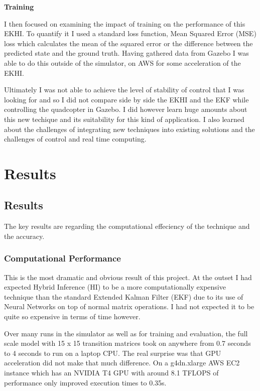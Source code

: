 \documentclass[]{../resources/final_report}
\begin{document}
\textbf{Training}

I then focused on examining the impact of training on the performance of this EKHI. To quantify it I used a standard loss function, Mean Squared Error (MSE) loss which calculates the mean of the squared error or the difference between the predicted state and the ground truth. Having gathered data from Gazebo I was able to do this outside of the simulator, on AWS for some acceleration of the EKHI.

Ultimately I was not able to achieve the level of stability of control that I was looking for and so I did not compare side by side the EKHI and the EKF while controlling the quadcopter in Gazebo. I did however learn huge amounts about this new techique and its suitability for this kind of application. I also learned about the challenges of integrating new techniques into existing solutions and the challenges of control and real time computing.

\chapter{Results}

\section{Results}

The key results are regarding the computational effeciency of the technique and the accuracy.

\subsection{Computational Performance}

This is the most dramatic and obvious result of this project. At the outset I had expected Hybrid Inference (HI) to be a more computationally expensive technique than the standard Extended Kalman Filter (EKF) due to its use of Neural Networks on top of normal matrix operations. I had not expected it to be quite so expensive in terms of time however.

Over many runs in the simulator as well as for training and evaluation, the full scale model with 15 x 15 transition matrices took on anywhere from 0.7 seconds to 4 seconds to run on a laptop CPU. The real surprise was that GPU acceleration did not make that much difference. On a g4dn.xlarge AWS EC2 instance which has an NVIDIA T4 GPU with around 8.1 TFLOPS of performance only improved execution times to 0.35s. 
\end{document}
